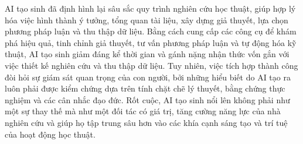 AI tạo sinh đã định hình lại sâu sắc quy trình nghiên cứu học thuật, giúp hợp lý hóa việc hình thành ý tưởng, tổng quan tài liệu, xây dựng giả thuyết, lựa chọn phương pháp luận và thu thập dữ liệu. Bằng cách cung cấp các công cụ để khám phá hiệu quả, tinh chỉnh giả thuyết, tư vấn phương pháp luận và tự động hóa kỹ thuật, AI tạo sinh giảm đáng kể thời gian và gánh nặng nhận thức vốn gắn với việc thiết kế nghiên cứu và thu thập dữ liệu. Tuy nhiên, việc tích hợp thành công đòi hỏi sự giám sát quan trọng của con người, bởi những hiểu biết do AI tạo ra luôn phải được kiểm chứng dựa trên tính chặt chẽ lý thuyết, bằng chứng thực nghiệm và các cân nhắc đạo đức. Rốt cuộc, AI tạo sinh nổi lên không phải như một sự thay thế mà như một đối tác có giá trị, tăng cường năng lực của nhà nghiên cứu và giúp họ tập trung sâu hơn vào các khía cạnh sáng tạo và trí tuệ của hoạt động học thuật.
